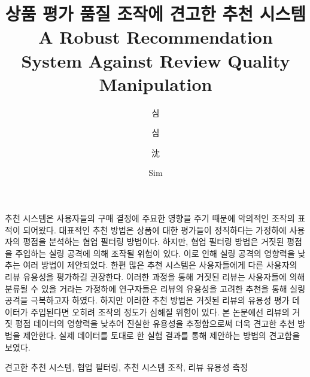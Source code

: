 \documentclass[master,english,final]{kaist-ucs}
\title[korean] {상품 평가 품질 조작에 견고한 추천 시스템}
\title[english]{A Robust Recommendation System \linebreak Against Review Quality Manipulation}
\author[korean] {심}{동 진}
\author[korean2] {심}{동진}    %
\author[chinese]{沈}{東 鎭}
\author[english]{Sim}{Dongjin}
\begin{document}

   \thesisinfo
    \begin{summary}
    추천 시스템은 사용자들의 구매 결정에 주요한 영향을 주기 때문에 악의적인 조작의 표적이 되어왔다.
    대표적인 추천 방법은 상품에 대한 평가들이 정직하다는 가정하에 사용자의 평점을 분석하는 협업 필터링 방법이다.
    하지만, 협업 필터링 방법은 거짓된 평점을 주입하는 실링 공격에 의해 조작될 위험이 있다.
    이로 인해 실링 공격의 영향력을 낮추는 여러 방법이 제안되었다.
    한편 많은 추천 시스템은 사용자들에게 다른 사용자의 리뷰 유용성을 평가하길 권장한다.
    이러한 과정을 통해 거짓된 리뷰는 사용자들에 의해 분류될 수 있을 거라는 가정하에 연구자들은 리뷰의 유용성을 고려한 추천을 통해 실링 공격을 극복하고자 하였다.
    하지만 이러한 추천 방법은 거짓된 리뷰의 유용성 평가 데이터가 주입된다면 오히려 조작의 정도가 심해질 위험이 있다.
    본 논문에선 리뷰의 거짓 평점 데이터의 영향력을 낮추어 진실한 유용성을 추정함으로써 더욱 견고한 추천 방법을 제안한다.
    실제 데이터를 토대로 한 실험 결과를 통해 제안하는 방법의 견고함을 보였다.
    \end{summary}

    \begin{Korkeyword}
    견고한 추천 시스템, 협업 필터링, 추천 시스템 조작, 리뷰 유용성 측정
    \end{Korkeyword}
\end{document}

